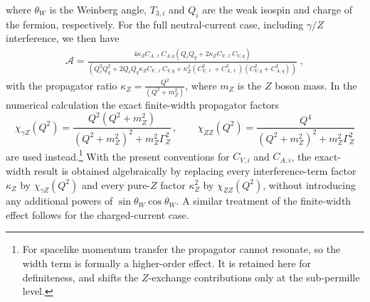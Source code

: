 \documentclass[a4paper,11pt]{article}
\begin{document}
where $\theta_W$ is the Weinberg angle, $T_{3,i}$ and $Q_i$ are the
weak isospin and charge of the fermion, respectively. For the full
neutral-current case, including $\gamma/Z$ interference, we then have
\begin{align}\label{eq:Aunpol}
\mathcal{A} = \frac{4 \kappa_Z C_{A,\ell} C_{A,q} \left(Q_\ell Q_q+2\kappa_Z C_{V,\ell}C_{V,q} \right)}
{\left(Q_\ell^2Q_q^2+2Q_\ell Q_q \kappa_Z C_{V,\ell}C_{V,q}
+\kappa_Z^2\left(C^2_{V,\ell}+C^2_{A,\ell}\right)\left(C^2_{V,q   }+C^2_{A,q   }\right)\right)}\;,
\end{align}
with the propagator ratio $\kappa_Z=\frac{Q^2}{(Q^2+m^2_Z)}$, where $m_Z$ is the $Z$ boson mass. In the numerical calculation the exact finite-width propagator factors
\begin{equation}
  \chi_{\gamma Z}(Q^2)=\frac{Q^2(Q^2+m_Z^2)}{(Q^2+m_Z^2)^2+m_Z^2\Gamma_Z^2}\,,
  \qquad
  \chi_{ZZ}(Q^2)=\frac{Q^4}{(Q^2+m_Z^2)^2+m_Z^2\Gamma_Z^2}
\end{equation}
are used instead.\footnote{For spacelike momentum transfer the propagator cannot resonate, so the width term is formally a higher-order effect. It is retained here for definiteness, and shifts the $Z$-exchange contributions only at the sub-permille level.} With the present conventions for $C_{V,i}$ and $C_{A,i}$, the exact-width result is obtained algebraically by replacing every interference-term factor $\kappa_Z$ by $\chi_{\gamma Z}(Q^2)$ and every pure-$Z$ factor $\kappa_Z^2$ by $\chi_{ZZ}(Q^2)$, without introducing any additional powers of $\sin\theta_W\cos\theta_W$. A similar treatment of the finite-width effect follows for the charged-current case.
\end{document}
